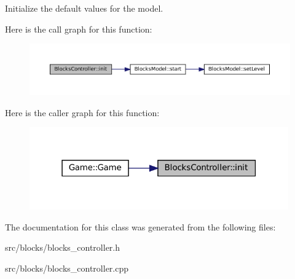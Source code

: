Initialize the default values for the model. 

Here is the call graph for this function\+:
\nopagebreak
\begin{figure}[H]
\begin{center}
\leavevmode
\includegraphics[width=350pt]{class_blocks_controller_a469ef02a49634593039a88e96dcff22c_cgraph}
\end{center}
\end{figure}
Here is the caller graph for this function\+:
\nopagebreak
\begin{figure}[H]
\begin{center}
\leavevmode
\includegraphics[width=316pt]{class_blocks_controller_a469ef02a49634593039a88e96dcff22c_icgraph}
\end{center}
\end{figure}


The documentation for this class was generated from the following files\+:\begin{DoxyCompactItemize}
\item 
src/blocks/blocks\+\_\+controller.\+h\item 
src/blocks/blocks\+\_\+controller.\+cpp\end{DoxyCompactItemize}

